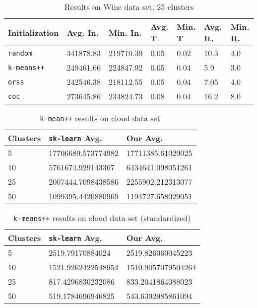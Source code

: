 \documentclass[twoside, 11pt]{article}
\begin{document}
		\begin{table}[p]
			\begin{center}
				\begin{tabular}{|l|l|l|l|l|l|l|}
					\hline
					Initialization & Avg. In. & Min. In. & Avg. T & Min. T & Avg. It. & Min. It.\\\hline
					\texttt{random} & 341878.83 & 219710.39 & 0.05 & 0.02 & 10.3 & 4.0\\\hline
					\texttt{k-means++} & 249461.66 & 224847.92 & 0.05 & 0.04 & 5.9 & 3.0\\\hline
					\texttt{orss} & 242546.38 & 218112.55 & 0.05 & 0.04 & 7.05 & 4.0\\\hline
					\texttt{coc} & 273645.86 & 234824.73 & 0.08 & 0.04 & 16.2 & 8.0\\\hline
				\end{tabular}
				\caption{Results on Wine data set, 25 clusters}
				\label{tbl:Wine25}
			\end{center}
		\end{table}
		
		\begin{table}[p]
			\begin{center}
				\begin{tabular}{|l|l|l|}
					\hline
					Clusters & \texttt{sk-learn} Avg. & Our Avg.\\\hline
					5 & 17706689.573774982& 17711385.61029025\\\hline
					10 & 5761674.929143367& 6434641.098051261\\\hline
					25 & 2007444.7098438586& 2255902.212313077\\\hline
					50 & 1099395.4420880969& 1194727.658029051\\\hline
				\end{tabular}
				\caption{\texttt{k-mean++} results on cloud data set}
				\label{tbl:cloud_no_preprocess}
			\end{center}
		\end{table}

		\begin{table}[p]
			\begin{center}
				\begin{tabular}{|l|l|l|}
					\hline
					Clusters & \texttt{sk-learn} Avg. & Our Avg.\\\hline
					5 & 2519.79170884024 & 2519.826060045223\\\hline
					10 & 1521.9262422548954 & 1510.9057079504264\\\hline
					25 & 817.4296830232086 & 833.2041864088023\\\hline
					50 & 519.1784696946825 & 543.6392985861094\\\hline
				\end{tabular}
				\caption{\texttt{k-means++} results on cloud data set (standardized)}
				\label{tbl:cloud_standardscaler}
			\end{center}
		\end{table}
\end{document}
